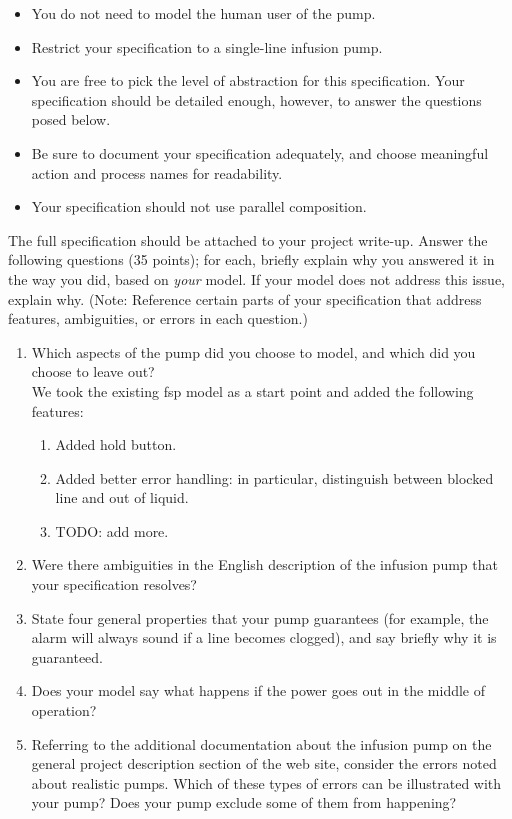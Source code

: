 \documentclass{article}
\begin{document}
\begin{itemize}
\item You do not need to model the human user of the pump.

\item Restrict your specification to a single-line infusion pump.

\item You are free to pick the level of abstraction for this specification. Your specification
should be detailed enough, however, to answer the questions posed below.

\item Be sure to document your specification adequately, and choose meaningful action and process names for readability.

\item Your specification should not use parallel composition.

\end{itemize}

\noindent The full specification should be attached to your project
write-up. Answer the following questions (35 points); for each,
briefly explain why you answered it in the way you did, based on
\emph{your} model. If your model does not address this issue,
explain why. (Note: Reference certain parts of your specification that address features, ambiguities, or errors in each question.)

\begin{enumerate}
\item Which aspects of the pump did you choose to model, and which did you choose to leave out? \\
  We took the existing fsp model as a start point and added the following features: \\
  \begin{enumerate}
  \item Added hold button.
  \item Added better error handling: in particular, distinguish between blocked line and out of liquid.
    \item TODO: add more.
  \end{enumerate}
    \item Were there ambiguities in the English description of the infusion pump that your specification resolves?
    \item State four general properties that your pump guarantees (for example, the alarm will always sound if a line becomes clogged), and say briefly why it is guaranteed.
    \item Does your model say what happens if the power goes out in the middle of operation?
    \item Referring to the additional documentation about the infusion pump on the general project description section of the web site, consider the errors noted about realistic pumps. Which of these types of errors can be illustrated with your pump? Does your pump exclude some of them from happening?

\end{enumerate}
\end{document}
